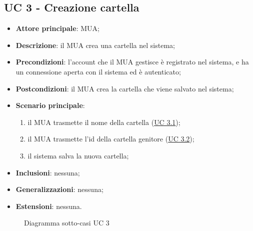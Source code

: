 \subsection{UC 3 - Creazione cartella} \label{sec:UC3}
    \begin{itemize}
        \item \textbf{Attore principale}: MUA;
        \item \textbf{Descrizione}: il MUA crea una cartella nel sistema;
        \item \textbf{Precondizioni}: l’account che il MUA gestisce è registrato nel sistema, e ha un connessione aperta con il sistema ed è autenticato;
        \item \textbf{Postcondizioni}: il MUA crea la cartella che viene salvato nel sistema;
        \item \textbf{Scenario principale}:
            \begin{enumerate}
                \item il MUA trasmette il nome della cartella (\hyperref[sec:UC3.1]{UC 3.1});
                \item il MUA trasmette l'id della cartella genitore (\hyperref[sec:UC3.2]{UC 3.2});
                \item il sistema salva la nuova cartella;
            \end{enumerate}
        \item \textbf{Inclusioni}: nessuna;
        \item \textbf{Generalizzazioni}: nessuna;
        \item \textbf{Estensioni}: nessuna.
    \end{itemize}

\begin{figure}[h]
    \centering
    \caption{Diagramma sotto-casi UC 3}
\end{figure}

